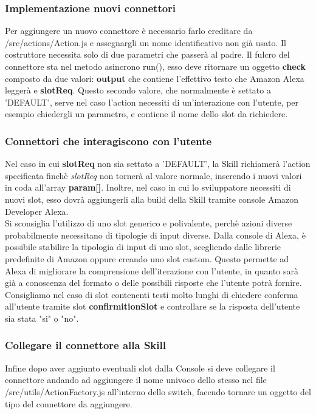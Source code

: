 \subsubsection{Implementazione nuovi connettori}
Per aggiungere un nuovo connettore è necessario farlo ereditare da /src/actions/Action.js e assegnargli un nome identificativo non già usato. Il costruttore necessita solo di due parametri che passerà al padre. Il fulcro del connettore sta nel metodo asincrono run(), esso deve ritornare un oggetto \textbf{check} composto da due valori: \textbf{output} che contiene l'effettivo testo che Amazon Alexa leggerà e \textbf{slotReq}. Questo secondo valore, che normalmente è settato a 'DEFAULT', serve nel caso l'action necessiti di un'interazione con l'utente, per esempio chiedergli un parametro, e contiene il nome dello slot da richiedere.

\subsubsection{Connettori che interagiscono con l'utente}
Nel caso in cui \textbf{slotReq} non sia settato a 'DEFAULT', la Skill richiamerà l'action specificata finchè \emph{slotReq} non tornerà al valore normale, inserendo i nuovi valori in coda all'array \textbf{param[]}. Inoltre, nel caso in cui lo sviluppatore necessiti di nuovi slot, esso dovrà aggiungerli alla build della Skill tramite console Amazon Developer Alexa.\\
Si sconsiglia l'utilizzo di uno slot generico e polivalente, perchè azioni diverse probabilmente necessitano di tipologie di input diverse. Dalla console di Alexa, è possibile stabilire la tipologia di input di uno slot, scegliendo dalle librerie predefinite di Amazon oppure creando uno slot custom. Questo permette ad Alexa di migliorare la comprensione dell'iterazione con l'utente, in quanto sarà già a conoscenza del formato o delle possibili risposte che l'utente potrà fornire.
Consigliamo nel caso di slot contenenti testi molto lunghi di chiedere conferma all'utente tramite slot \textbf{confirmitionSlot} e controllare se la risposta dell'utente sia stata "si" o "no".

\subsubsection{Collegare il connettore alla Skill}
Infine dopo aver aggiunto eventuali slot dalla Console si deve collegare il connettore andando ad aggiungere il nome univoco dello stesso nel file /src/utils/ActionFactory.js all'interno dello switch, facendo tornare un oggetto del tipo del connettore da aggiungere.